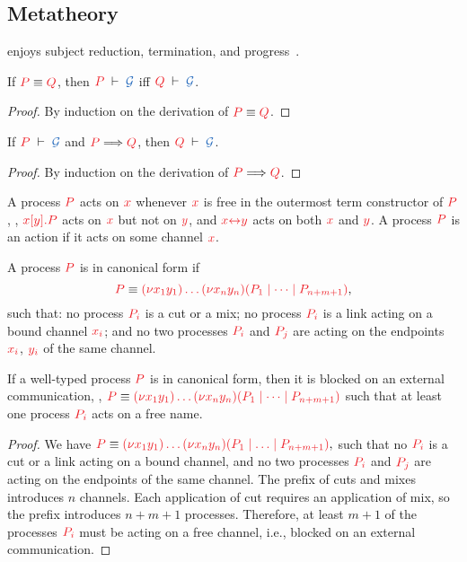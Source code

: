 \documentclass[envcountsame,UKenglish]{llncs}
\begin{document}
\subsection{Metatheory}
\label{sec:hcp-metatheory}
\hcp enjoys subject reduction, termination, and progress~\cite{kokke2018tlla}.
\begin{lemma}\label{lem:hcp-preservation-equiv}
  If $\tm{P}\equiv\tm{Q}$, then $\seq[P]{\mathcal{G}}$ iff $\seq[Q]{\mathcal{G}}$.
\end{lemma} 
\begin{proof}
  By induction on the derivation of $\tm{P}\equiv\tm{Q}$.
\end{proof}
\begin{theorem}[Preservation]\label{thm:hcp-preservation}
  If $\seq[P]{\mathcal{G}}$ and $\reducesto{P}{Q}$, then $\seq[Q]{\mathcal{G}}$.
\end{theorem} 
\begin{proof}
  By induction on the derivation of $\reducesto{P}{Q}$.
\end{proof}
\begin{definition}[Actions]
  A process $\tm{P}$ acts on $\tm{x}$ whenever $\tm{x}$ is free in the outermost
  term constructor of $\tm{P}$, \eg, $\tm{\piSend{x}{y}{P}}$ acts on $\tm{x}$
  but not on $\tm{y}$, and $\tm{\cpLink{x}{y}}$ acts on both $\tm{x}$ and $\tm{y}$.
  A process $\tm{P}$ is an action if it acts on some channel $\tm{x}$.
\end{definition}
\begin{definition}\label{def:hcp-canonical-forms}
  A process $\tm{P}$ is in canonical form if
  \[
  \tm{P} \equiv \tm{\piNew{x_1}{y_1}{\dots\piNew{x_n}{y_n}{(P_1 \mid \dots \mid P_{n+m+1})}}},
  \]
  such that: no process $\tm{P_i}$ is a cut or a mix; no process $\tm{P_i}$ is a link acting on a bound channel $\tm{x_i}$; and no two processes $\tm{P_i}$ and $\tm{P_j}$ are acting on the endpoints $\tm{x_i}$, $\tm{y_i}$ of the same channel.
\end{definition}
\begin{lemma}
  If a well-typed process $\tm{P}$ is in canonical form, then it is blocked on
  an external communication, \ie,
  $\tm{P}\equiv\tm{\piNew{x_1}{y_1}{\dots\piNew{x_n}{y_n}{(P_1\mid\dots\mid P_{n+m+1})}}}$
  such that at least one process $\tm{P_i}$ acts on a free name.
\end{lemma}
\begin{proof}
  We have
  \(
  \tm{P} \equiv \tm{\piNew{x_1}{y_1}{\dots\piNew{x_n}{y_n}{(P_1 \ppar \dots \ppar P_{n+m+1})}}},
  \)
  such that no $\tm{P_i}$ is a cut or a link acting on a bound channel, and no two processes $\tm{P_i}$ and $\tm{P_j}$ are acting on the endpoints of the same channel. The prefix of cuts and mixes introduces $n$ channels. Each application of cut requires an application of mix, so the prefix introduces $n+m+1$ processes. Therefore, at least $m+1$ of the processes $\tm{P_i}$ must be acting on a free channel, i.e., blocked on an external communication.
\end{proof}
\end{document}
